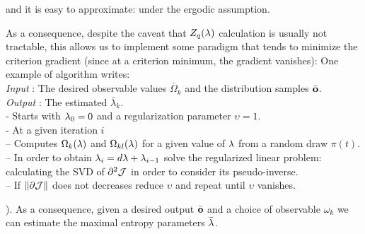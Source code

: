 {
and it is easy to approximate:
under the ergodic assumption.

As a consequence, despite the caveat that $Z_q({\bf \lambda})$ calculation is usually not tractable, this allows us to implement some paradigm that tends to minimize the criterion gradient (since at a criterion minimum, the gradient vanishes):
One example of algorithm writes:
\\ \hphantom{2mm} {\em Input} : The desired observable values $\bar{\Omega}_{k}$ and the distribution samples $\bar{\bf o}$.
\\ \hphantom{2mm} {\em Output} : The estimated $\bar{\lambda}_k$.
\\ \hphantom{4mm} - Starts with ${\bf \lambda}_0 = 0$ and a regularization parameter $\upsilon = 1$.
\\ \hphantom{4mm} - At a given iteration $i$
\\ \hphantom{4mm} -- Computes $\Omega_k({\bf \lambda})$ and $\Omega_{kl}({\bf \lambda})$ for a given value of ${\bf \lambda}$ from a random draw $\pi(t)$.
\\ \hphantom{4mm} -- In order to obtain ${\bf \lambda}_{i} = d{\bf \lambda} + {\bf \lambda}_{i-1}$ solve the regularized linear problem: 
calculating the SVD of $\partial^2 {\cal J}$ in order to consider its pseudo-inverse.
\\ \hphantom{4mm} -- If $\|\partial {\cal J}\|$ does not decreases reduce $\upsilon$ and repeat until $\upsilon$ vanishes.
\hr}). As a consequence, given a desired output $\bar{\bf o}$ and a choice of observable $\omega_k$ we can estimate the maximal entropy parameters $\bar{\bf \lambda}$.

